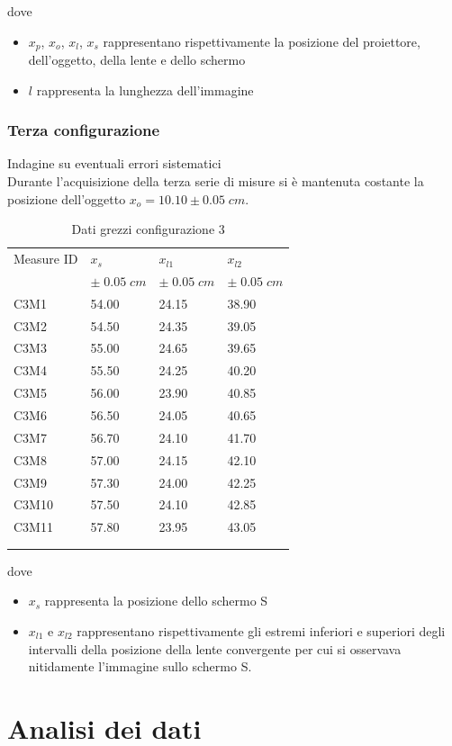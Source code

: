\documentclass[11pt,a4paper]{article}
\begin{document}
dove
\begin{itemize}
    \item $x_p$, $x_o$, $x_l$, $x_s$ rappresentano rispettivamente la posizione del proiettore, dell'oggetto, della lente e dello schermo
    \item $l$ rappresenta la lunghezza dell'immagine
\end{itemize}

\subsubsection{Terza configurazione}
Indagine su eventuali errori sistematici
\\
Durante l'acquisizione della terza serie di misure si è mantenuta costante la posizione dell'oggetto $x_o = 10.10 \pm 0.05 \; cm$.

\begin{longtable}[]{@{}llll@{}}
    \toprule
    Measure ID & $x_s$ & $x_{l1}$ & $x_{l2}$ \tabularnewline
      & $\pm \; 0.05 \; cm$ & $\pm \; 0.05 \; cm$ & $\pm \; 0.05 \; cm$ \tabularnewline
    \midrule
    \endhead
    C3M1 & 54.00 & 24.15 & 38.90 \tabularnewline
    C3M2 & 54.50 & 24.35 & 39.05\tabularnewline
    C3M3 & 55.00 & 24.65 & 39.65\tabularnewline
    C3M4 & 55.50 & 24.25 & 40.20\tabularnewline
    C3M5 & 56.00 & 23.90 & 40.85\tabularnewline
    C3M6 & 56.50 & 24.05 & 40.65\tabularnewline
    C3M7 & 56.70 & 24.10 & 41.70\tabularnewline
    C3M8 & 57.00 & 24.15 & 42.10\tabularnewline
    C3M9 & 57.30 & 24.00 & 42.25\tabularnewline
    C3M10 & 57.50 & 24.10 & 42.85\tabularnewline
    C3M11 & 57.80 & 23.95 & 43.05\tabularnewline
    \bottomrule
    \label{tab:dconf3}
    \\
    \caption{Dati grezzi configurazione 3}
\end{longtable}

dove
\begin{itemize}
    \item $x_s$ rappresenta la posizione dello schermo S
    \item $x_{l1}$ e $x_{l2}$ rappresentano rispettivamente gli estremi inferiori e superiori degli intervalli della posizione della lente convergente per cui si osservava nitidamente l'immagine sullo schermo S.
\end{itemize}




\section{Analisi dei dati}
\end{document}

